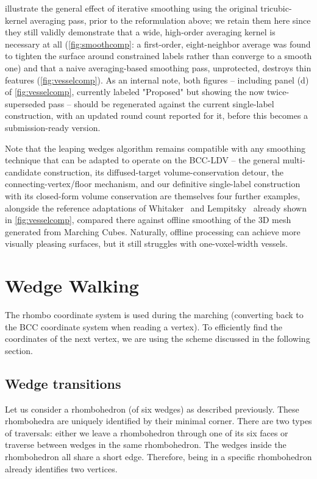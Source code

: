 \documentclass[journal]{vgtc}                     %
\begin{document}
 illustrate the general effect of iterative smoothing using the original tricubic-kernel averaging pass, prior to the reformulation above; we retain them here since they still validly demonstrate that a wide, high-order averaging kernel is necessary at all (\cref{fig:smoothcomp}: a first-order, eight-neighbor average was found to tighten the surface around constrained labels rather than converge to a smooth one) and that a naive averaging-based smoothing pass, unprotected, destroys thin features (\cref{fig:vesselcomp}). As an internal note, both figures -- including panel (d) of \cref{fig:vesselcomp}, currently labeled "Proposed" but showing the now twice-superseded pass -- should be regenerated against the current single-label construction, with an updated round count reported for it, before this becomes a submission-ready version.

Note that the leaping wedges algorithm remains compatible with any smoothing technique that can be adapted to operate on the BCC-LDV -- the general multi-candidate construction, its diffused-target volume-conservation detour, the connecting-vertex/floor mechanism, and our definitive single-label construction with its closed-form volume conservation are themselves four further examples, alongside the reference adaptations of Whitaker~\cite{whitaker2000reducing} and Lempitsky~\cite{lempitsky2010surface} already shown in \cref{fig:vesselcomp}, compared there against offline smoothing of the 3D mesh generated from Marching Cubes. Naturally, offline processing can achieve more visually pleasing surfaces, but it still struggles with one-voxel-width vessels.

\section{Wedge Walking} \label{sec:walking}

The rhombo coordinate system is used during the marching (converting back to the BCC coordinate system when reading a vertex). To efficiently find the coordinates of the next vertex, we are using the scheme discussed in the following section.

\subsection{Wedge transitions} \label{sec:wedgetrans}

Let us consider a rhombohedron (of six wedges) as described previously. These rhombohedra are uniquely identified by their minimal corner. There are two types of traversals: either we leave a rhombohedron through one of its six faces or traverse between wedges in the same rhombohedron. The wedges inside the rhombohedron all share a short edge. Therefore, being in a specific rhombohedron already identifies two vertices.
\end{document}
